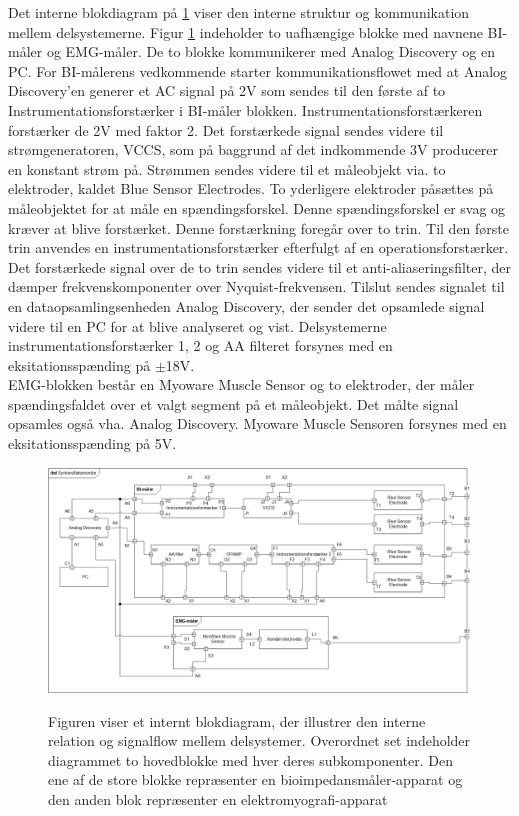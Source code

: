 Det interne blokdiagram på \ref{ibdfigur} viser den interne struktur og kommunikation mellem delsystemerne. Figur \ref{ibdfigur} indeholder to uafhængige blokke med navnene BI-måler og EMG-måler. De to blokke kommunikerer med Analog Discovery og en PC. For BI-målerens vedkommende starter kommunikationsflowet med at Analog Discovery'en generer et AC signal på 2V som sendes til den første af to Instrumentationsforstærker i BI-måler blokken. Instrumentationsforstærkeren forstærker de 2V med faktor 2. Det forstærkede signal sendes videre til strømgeneratoren, VCCS, som på baggrund af det indkommende 3V producerer en konstant strøm på. Strømmen sendes videre til et måleobjekt via. to elektroder, kaldet Blue Sensor Electrodes.  To yderligere elektroder påsættes på måleobjektet for at måle en spændingsforskel. Denne spændingsforskel er svag og kræver at blive forstærket. Denne forstærkning foregår over to trin. Til den første trin anvendes en instrumentationsforstærker efterfulgt af en operationsforstærker. Det forstærkede signal over de to trin sendes videre til et anti-aliaseringsfilter, der dæmper frekvenskomponenter over Nyquist-frekvensen. Tilslut sendes signalet til en dataopsamlingsenheden Analog Discovery, der sender det opsamlede signal videre til en PC for at blive analyseret og vist. Delsystemerne instrumentationsforstærker 1, 2 og AA filteret forsynes med en eksitationsspænding på $ \pm  $18V. \\

EMG-blokken består en Myoware Muscle Sensor og to elektroder, der måler spændingsfaldet over et valgt segment på et måleobjekt. Det målte signal opsamles også vha. Analog Discovery. Myoware Muscle Sensoren forsynes med en eksitationsspænding på 5V.  

\begin{figure}[H]
\centering
{\includegraphics[width=\linewidth]
{Figure/IBD}}
\caption{Figuren viser et internt blokdiagram, der illustrer den interne relation og signalflow mellem delsystemer. Overordnet set indeholder diagrammet to hovedblokke med hver deres subkomponenter. Den ene af de store blokke repræsenter en bioimpedansmåler-apparat og den anden blok repræsenter en elektromyografi-apparat }
\label{ibdfigur}
\end{figure}

